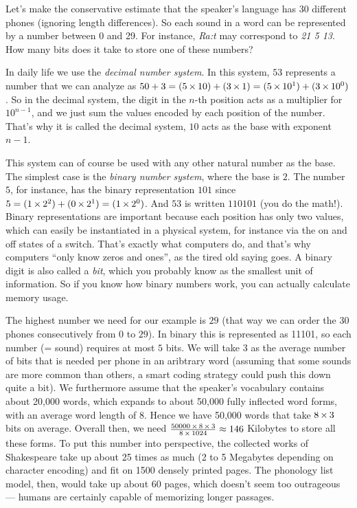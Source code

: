Let's make the conservative estimate that the speaker's language has 30 different phones (ignoring length differences). 
So each sound in a word can be represented by a number between 0 and 29.
For instance, \emph{Ra:t} may correspond to \emph{21 5 13}.
How many bits does it take to store one of these numbers?
%
\begin{techinfo}
    In daily life we use the \emph{decimal number system}.
    In this system, $53$ represents a number that we can analyze as $50 + 3 = (5 \mathop{\times} 10) + (3 \mathop{\times} 1) = (5 \mathop{\times} 10^1) + (3 \mathop{\times} 10^0)$.
    So in the decimal system, the digit in the $n$-th position acts as a multiplier for $10^{n-1}$, and we just sum the values encoded by each position of the number.
    That's why it is called the decimal system, $10$ acts as the base with exponent $n-1$.

    This system can of course be used with any other natural number as the base.
    The simplest case is the \emph{binary number system}, where the base is $2$.
    The number $5$, for instance, has the binary representation $101$ since $5 = (1 \mathop{\times} 2^2) + (0 \mathop{\times} 2^1) = (1 \mathop{\times} 2^0)$.
    And $53$ is written $110101$ (you do the math!).
    Binary representations are important because each position has only two values, which can easily be instantiated in a physical system, for instance via the on and off states of a switch.
    That's exactly what computers do, and that's why computers ``only know zeros and ones'', as the tired old saying goes.
    A binary digit is also called a \emph{bit}, which you probably know as the smallest unit of information.
    So if you know how binary numbers work, you can actually calculate memory usage.
\end{techinfo}

The highest number we need for our example is $29$ (that way we can order the 30 phones consecutively from $0$ to $29$).
In binary this is represented as 11101, so each number (= sound) requires at most $5$ bits.
We will take $3$ as the average number of bits that is needed per phone in an aribtrary word (assuming that some sounds are more common than others, a smart coding strategy could push this down quite a bit).
We furthermore assume that the speaker's vocabulary contains about 20,000 words, which expands to about 50,000 fully inflected word forms, with an average word length of $8$.
Hence we have 50,000 words that take $8 \mathop{\times} 3$ bits on average.
Overall then, we need $\frac{50000 \mathop{\times} 8 \mathop{\times} 3}{8 \mathop{\times} 1024} \approx 146$ Kilobytes to store all these forms.
To put this number into perspective, the collected works of Shakespeare take up about 25 times as much (2 to 5 Megabytes depending on character encoding) and fit on 1500 densely printed pages.
The phonology list model, then, would take up about 60 pages, which doesn't seem too outrageous --- humans are certainly capable of memorizing longer passages. 

